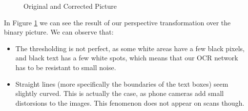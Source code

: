 \documentclass[11pt, a4paper]{report}
\begin{document}
\begin{figure}[!h]
	\hfill
	\hfill
	\caption{Original and Corrected Picture}
	\label{parser-corrected-image}
\end{figure}

In Figure \ref{parser-corrected-image} we can see the result of our perspective transformation over the binary picture. We can observe that:

\begin{itemize}
	\item The thresholding is not perfect, as some white areas have a few black pixels, and black text has a few white spots, which means that our OCR network has to be resistant to small noise.
	\item Straight lines (more specifically the boundaries of the text boxes) seem slightly curved. This is actually the case, as phone cameras add small distorsions to the images. This fenomenon does not appear on scans though.
\end{itemize}
\end{document}
